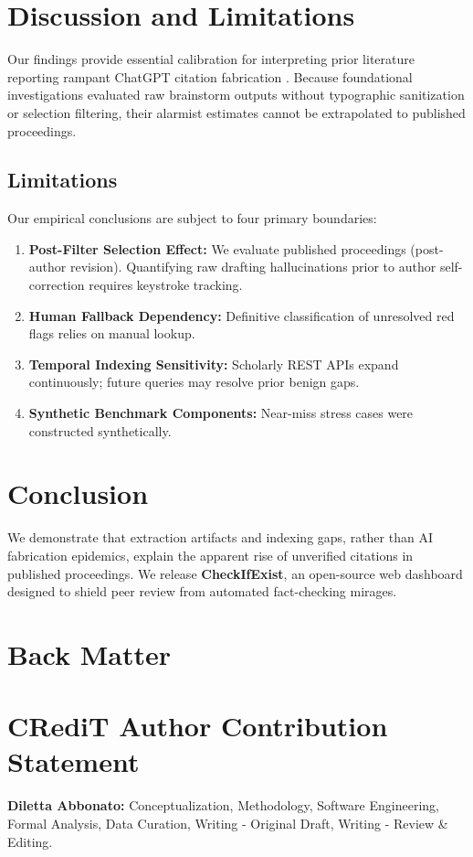 \documentclass[11pt, a4paper]{article}
\begin{document}
\section{Discussion and Limitations}
Our findings provide essential calibration for interpreting prior literature reporting rampant ChatGPT citation fabrication \citep{bhattacharyya2023}. Because foundational investigations evaluated raw brainstorm outputs without typographic sanitization or selection filtering, their alarmist estimates cannot be extrapolated to published proceedings.

\subsection{Limitations}
Our empirical conclusions are subject to four primary boundaries:
\begin{enumerate}
    \item \textbf{Post-Filter Selection Effect:} We evaluate published proceedings (post-author revision). Quantifying raw drafting hallucinations prior to author self-correction requires keystroke tracking.
    \item \textbf{Human Fallback Dependency:} Definitive classification of unresolved red flags relies on manual lookup.
    \item \textbf{Temporal Indexing Sensitivity:} Scholarly REST APIs expand continuously; future queries may resolve prior benign gaps.
    \item \textbf{Synthetic Benchmark Components:} Near-miss stress cases were constructed synthetically.
\end{enumerate}

\section{Conclusion}
We demonstrate that extraction artifacts and indexing gaps, rather than AI fabrication epidemics, explain the apparent rise of unverified citations in published proceedings. We release \textbf{CheckIfExist}, an open-source web dashboard designed to shield peer review from automated fact-checking mirages.

\section*{Back Matter}

\section*{CRediT Author Contribution Statement}
\textbf{Diletta Abbonato:} Conceptualization, Methodology, Software Engineering, Formal Analysis, Data Curation, Writing - Original Draft, Writing - Review \& Editing.
\end{document}
